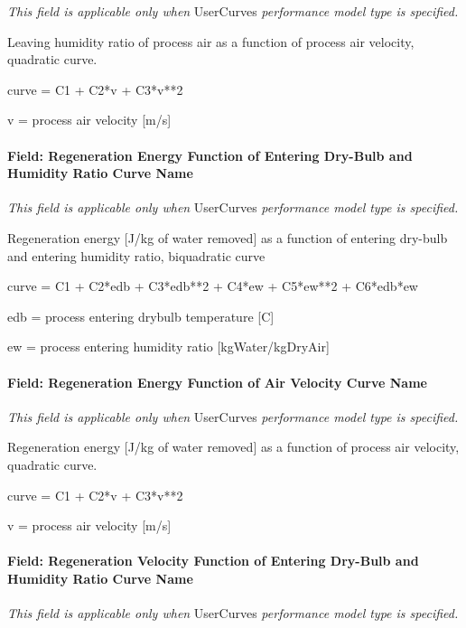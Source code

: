\emph{This field is applicable only when} UserCurves \emph{performance model type is specified.}

Leaving humidity ratio of process air as a function of process air velocity, quadratic curve.

curve = C1 + C2*v + C3*v**2

v = process air velocity {[}m/s{]}

\paragraph{Field: Regeneration Energy Function of Entering Dry-Bulb and Humidity Ratio Curve Name}\label{field-regeneration-energy-function-of-entering-dry-bulb-and-humidity-ratio-curve-name}

\emph{This field is applicable only when} UserCurves \emph{performance model type is specified.}

Regeneration energy {[}J/kg of water removed{]} as a function of entering dry-bulb and entering humidity ratio, biquadratic curve

curve = C1 + C2*edb + C3*edb**2 + C4*ew + C5*ew**2 + C6*edb*ew

edb = process entering drybulb temperature {[}C{]}

ew = process entering humidity ratio {[}kgWater/kgDryAir{]}

\paragraph{Field: Regeneration Energy Function of Air Velocity Curve Name}\label{field-regeneration-energy-function-of-air-velocity-curve-name}

\emph{This field is applicable only when} UserCurves \emph{performance model type is specified.}

Regeneration energy {[}J/kg of water removed{]} as a function of process air velocity, quadratic curve.

curve = C1 + C2*v + C3*v**2

v = process air velocity {[}m/s{]}

\paragraph{Field: Regeneration Velocity Function of Entering Dry-Bulb and Humidity Ratio Curve Name}\label{field-regeneration-velocity-function-of-entering-dry-bulb-and-humidity-ratio-curve-name}

\emph{This field is applicable only when} UserCurves \emph{performance model type is specified.}

